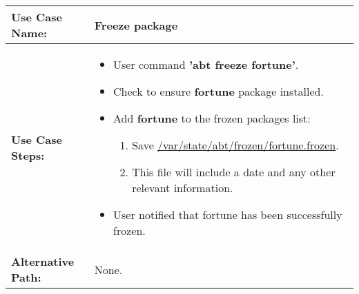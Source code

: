 \medskip

\begin{tabularx}{\linewidth}{|l|X|}
\hline
\textbf{Use Case Name:} & \textbf{Freeze package} \\
\hline
\textbf{Use Case Steps:} & 
\begin{minipage}{\linewidth} 
  \vspace{0.05em}
  \begin{itemize}
   \item User command \textbf{'abt freeze fortune'}.
    \item Check to ensure \textbf{fortune} package installed.
    \item Add \textbf{fortune} to the frozen packages list:
    \begin{enumerate}
      \item Save \url{/var/state/abt/frozen/fortune.frozen}.
      \item This file will include a date and any other relevant information.
    \end{enumerate}
    \item User notified that fortune has been successfully frozen.
  \end{itemize}
  \vspace{0.05em}
\end{minipage}
\\
\hline 
\textbf{Alternative Path:} & None. \\
\hline
\end{tabularx}

\newpage

